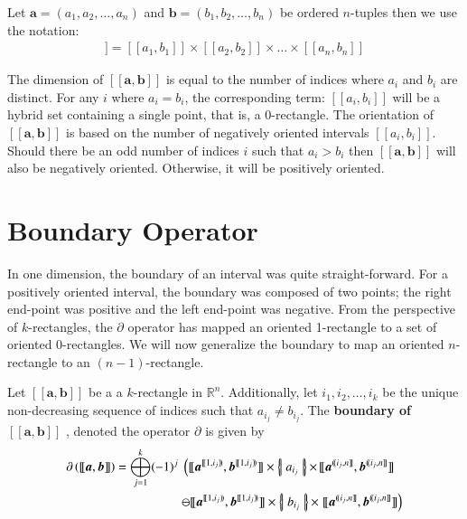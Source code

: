 \begin{definition}
	Let $\boldsymbol{a} = (a_1, a_2, \ldots, a_n)$ and 
	$\boldsymbol{b} = (b_1, b_2, \ldots, b_n)$ be ordered $n$-tuples then we use the notation:
	\begin{align}
		[\![ \boldsymbol{a}, \boldsymbol{b} ]\!] 
		= [\![a_1, b_1]\!] \times [\![a_2, b_2 ]\!] \times \ldots \times [\![a_n , b_n]\!]
	\end{align}
\end{definition}

The dimension of $[\![ \boldsymbol{a}, \boldsymbol{b} ]\!]$ is equal to the number of indices where $a_i$ and $b_i$ are distinct.
For any $i$ where $a_i = b_i$, the corresponding term: $[\![ a_i, b_i ]\!]$ will be a hybrid set containing a single point, that is, a 0-rectangle.
The orientation of $[\![ \boldsymbol{a}, \boldsymbol{b} ]\!]$ is based on the number of negatively oriented intervals $[\![a_i,b_i]\!]$.
Should there be an odd number of indices $i$ such that $a_i > b_i$ then $[\![ \boldsymbol{a}, \boldsymbol{b} ]\!]$ will also be negatively oriented.
Otherwise, it will be positively oriented. 

\section{Boundary Operator}

In one dimension, the boundary of an interval was quite straight-forward.
For a positively oriented interval, the boundary was composed of two points; 
the right end-point was positive and the left end-point was negative.
From the perspective of $k$-rectangles, 
the $\partial$ operator has mapped an oriented 1-rectangle to a set of oriented 0-rectangles.
We will now generalize the boundary to map an oriented $n$-rectangle to an $(n-1)$-rectangle.

\begin{definition}
	Let  $[\![\boldsymbol{a}, \boldsymbol{b}]\!]$ be a a $k$-rectangle in $\mathbb{R}^n$.
	Additionally, let $i_1, i_2, \ldots, i_k$ be the unique non-decreasing sequence of indices such that $a_{i_j} \neq b_{i_j}$.
	The \textbf{boundary of $ \boldsymbol{[\![ a,b ]\!]} $ }, denoted the operator $\partial$ is given by
	\begin{align}
		\partial \left( [\![ \boldsymbol{a}, \boldsymbol{b} ]\!] \right) 
		= \bigoplus_{j=1}^k (-1)^j \;
			\left(	
			[\![ \boldsymbol{a}^{[\![1,i_j)\!)}, \boldsymbol{b}^{[\![1,i_j)\!)} ]\!]
			\times \hset{a_{i_j}} \times \right. &
			[\![ \boldsymbol{a}^{(\!(i_j,n]\!]}, \boldsymbol{b}^{(\!(i_j,n]\!]} ]\!]  \notag\\
			\ominus
			[\![ \boldsymbol{a}^{[\![1,i_j)\!)}, \boldsymbol{b}^{[\![1,i_j)\!)} ]\!]
			\times \hset{b_{i_j}} \times & \left.
			[\![ \boldsymbol{a}^{(\!(i_j,n]\!]}, \boldsymbol{b}^{(\!(i_j,n]\!]} ]\!]
			\right)
	\end{align}
\end{definition}

